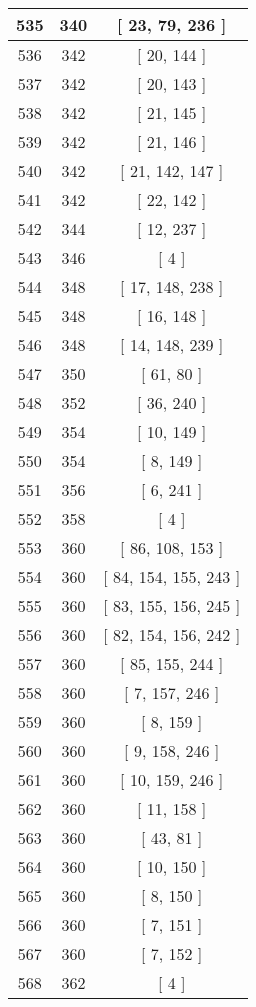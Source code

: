 \begin{center}
\begin{longtable}[H]{|| c c c ||}
\hline
535 & 340 & [ 23, 79, 236 ] \\ 
\hline
536 & 342 & [ 20, 144 ] \\ 
\hline
537 & 342 & [ 20, 143 ] \\ 
\hline
538 & 342 & [ 21, 145 ] \\ 
\hline
539 & 342 & [ 21, 146 ] \\ 
\hline
540 & 342 & [ 21, 142, 147 ] \\ 
\hline
541 & 342 & [ 22, 142 ] \\ 
\hline
542 & 344 & [ 12, 237 ] \\ 
\hline
543 & 346 & [ 4 ] \\ 
\hline
544 & 348 & [ 17, 148, 238 ] \\ 
\hline
545 & 348 & [ 16, 148 ] \\ 
\hline
546 & 348 & [ 14, 148, 239 ] \\ 
\hline
547 & 350 & [ 61, 80 ] \\ 
\hline
548 & 352 & [ 36, 240 ] \\ 
\hline
549 & 354 & [ 10, 149 ] \\ 
\hline
550 & 354 & [ 8, 149 ] \\ 
\hline
551 & 356 & [ 6, 241 ] \\ 
\hline
552 & 358 & [ 4 ] \\ 
\hline
553 & 360 & [ 86, 108, 153 ] \\ 
\hline
554 & 360 & [ 84, 154, 155, 243 ] \\ 
\hline
555 & 360 & [ 83, 155, 156, 245 ] \\ 
\hline
556 & 360 & [ 82, 154, 156, 242 ] \\ 
\hline
557 & 360 & [ 85, 155, 244 ] \\ 
\hline
558 & 360 & [ 7, 157, 246 ] \\ 
\hline
559 & 360 & [ 8, 159 ] \\ 
\hline
560 & 360 & [ 9, 158, 246 ] \\ 
\hline
561 & 360 & [ 10, 159, 246 ] \\ 
\hline
562 & 360 & [ 11, 158 ] \\ 
\hline
563 & 360 & [ 43, 81 ] \\ 
\hline
564 & 360 & [ 10, 150 ] \\ 
\hline
565 & 360 & [ 8, 150 ] \\ 
\hline
566 & 360 & [ 7, 151 ] \\ 
\hline
567 & 360 & [ 7, 152 ] \\ 
\hline
568 & 362 & [ 4 ] \\ 
\hline

\end{longtable}
\end{center}
